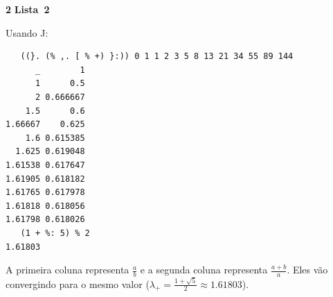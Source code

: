 \documentclass{article}
\newcounter{exe-list}
\newenvironment{exe-list}
    {\begin{list}{(\alph{exe-list})}{\usecounter{exe-list}}}
    {\end{list}}
\newenvironment{exe}[2][Sala]
    {\bigskip\noindent\par\ifthenelse{\equal{#1}{}}%
        {\textbf{\LARGE #2}}%
        {\textbf{\LARGE #1~#2}}%
    \medskip\noindent\par}
    {\bigskip}
\begin{document}
\begin{exe}[Lista]{2}
\begin{exe-list}
        \item
            Usando J:
            \begin{verbatim}
   ((}. (% ,. [ % +) }:)) 0 1 1 2 3 5 8 13 21 34 55 89 144
      _        1
      1      0.5
      2 0.666667
    1.5      0.6
1.66667    0.625
    1.6 0.615385
  1.625 0.619048
1.61538 0.617647
1.61905 0.618182
1.61765 0.617978
1.61818 0.618056
1.61798 0.618026
   (1 + %: 5) % 2
1.61803
            \end{verbatim}
            A primeira coluna representa \(\frac{a}{b}\) e
            a segunda coluna representa \(\frac{a+b}{a}\).
            Eles vão convergindo para o mesmo valor
            (\(\lambda_+ = \frac{1 + \sqrt{5}}{2} \approx 1.61803\)).
    \end{exe-list}
\end{exe}
\end{document}
